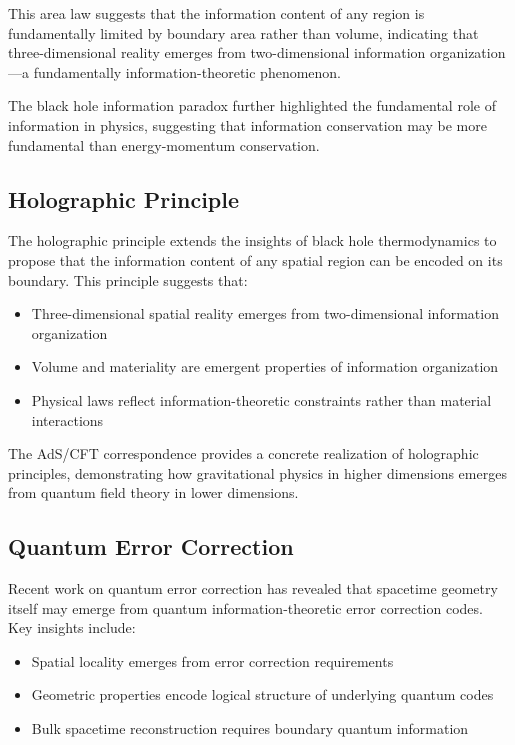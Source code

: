 \documentclass[12pt]{article}
\begin{document}
This area law suggests that the information content of any region is fundamentally limited by boundary area rather than volume, indicating that three-dimensional reality emerges from two-dimensional information organization—a fundamentally information-theoretic phenomenon.

The black hole information paradox further highlighted the fundamental role of information in physics, suggesting that information conservation may be more fundamental than energy-momentum conservation.

\subsection{Holographic Principle}

The holographic principle extends the insights of black hole thermodynamics to propose that the information content of any spatial region can be encoded on its boundary. This principle suggests that:

\begin{itemize}
\item Three-dimensional spatial reality emerges from two-dimensional information organization
\item Volume and materiality are emergent properties of information organization
\item Physical laws reflect information-theoretic constraints rather than material interactions
\end{itemize}

The AdS/CFT correspondence provides a concrete realization of holographic principles, demonstrating how gravitational physics in higher dimensions emerges from quantum field theory in lower dimensions.

\subsection{Quantum Error Correction}

Recent work on quantum error correction has revealed that spacetime geometry itself may emerge from quantum information-theoretic error correction codes. Key insights include:

\begin{itemize}
\item Spatial locality emerges from error correction requirements
\item Geometric properties encode logical structure of underlying quantum codes
\item Bulk spacetime reconstruction requires boundary quantum information
\end{itemize}
\end{document}
